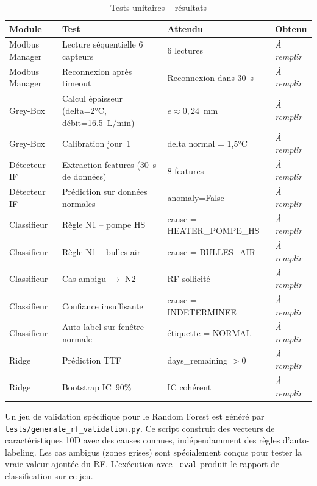 \begin{table}[htbp]
\centering
\caption{Tests unitaires -- résultats}
\label{tab:tests_unitaires}
\begin{tabular}{p{}p{}p{}p{}}
\toprule
\textbf{Module} & \textbf{Test} & \textbf{Attendu} & \textbf{Obtenu} \\
\midrule
Modbus Manager & Lecture séquentielle 6 capteurs & 6 lectures & \textit{À remplir} \\
Modbus Manager & Reconnexion après timeout & Reconnexion dans 30~s & \textit{À remplir} \\
Grey-Box & Calcul épaisseur (delta=2°C, débit=16.5~L/min) & \(e \approx 0,24\)~mm & \textit{À remplir} \\
Grey-Box & Calibration jour~1 & delta normal = 1,5°C & \textit{À remplir} \\
Détecteur IF & Extraction features (30~s de données) & 8 features & \textit{À remplir} \\
Détecteur IF & Prédiction sur données normales & anomaly=False & \textit{À remplir} \\
Classifieur & Règle N1 -- pompe HS & cause = HEATER\_POMPE\_HS & \textit{À remplir} \\
Classifieur & Règle N1 -- bulles air & cause = BULLES\_AIR & \textit{À remplir} \\
Classifieur & Cas ambigu $\rightarrow$ N2 & RF sollicité & \textit{À remplir} \\
Classifieur & Confiance insuffisante & cause = INDETERMINEE & \textit{À remplir} \\
Classifieur & Auto-label sur fenêtre normale & étiquette = NORMAL & \textit{À remplir} \\
Ridge & Prédiction TTF & days\_remaining $>0$ & \textit{À remplir} \\
Ridge & Bootstrap IC~90\% & IC cohérent & \textit{À remplir} \\
\bottomrule
\end{tabular}
\end{table}

Un jeu de validation spécifique pour le Random Forest est généré par \texttt{tests/generate\_rf\_validation.py}. Ce script construit des vecteurs de caractéristiques 10D avec des causes connues, indépendamment des règles d'auto-labeling. Les cas ambigus (zones grises) sont spécialement conçus pour tester la vraie valeur ajoutée du RF. L'exécution avec \texttt{--eval} produit le rapport de classification sur ce jeu.

